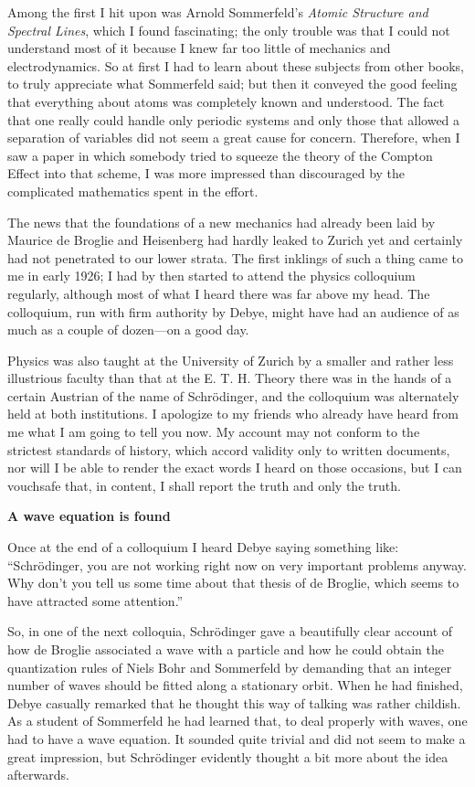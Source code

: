 \documentclass[12pt]{article}
\begin{document}
Among the first I hit upon was Arnold Sommerfeld's {\it Atomic Structure and Spectral Lines}, which I found fascinating; the only trouble was that I could not understand most of it because I knew far too little of mechanics and electrodynamics. So at first I had to learn about these subjects from other books, to truly appreciate what Sommerfeld said; but then it conveyed the good feeling that everything about atoms was completely known and understood. The fact that one really could handle only periodic systems and only those that allowed a separation of variables did not seem a great cause for concern. Therefore, when I saw a paper in which somebody tried to squeeze the theory of the Compton Effect into that scheme, I was more impressed than discouraged by the complicated mathematics spent in the effort.

The news that the foundations of a new mechanics had already been laid by Maurice de Broglie and Heisenberg had hardly leaked to Zurich yet and certainly had not penetrated to our lower strata. The first inklings of such a thing came to me in early 1926; I had by then started to attend the physics colloquium regularly, although most of what I heard there was far above my head. The colloquium, run
with firm authority by Debye, might have had an audience of as much as a couple of dozen---on a good day.

Physics was also taught at the University of Zurich by a smaller and rather less illustrious faculty than that at the E. T. H. Theory there was in the hands of a certain Austrian of the name of Schr\"odinger, and the colloquium was alternately held at both institutions. I apologize to my friends who already have heard from me what I am going to tell you now. My account may not conform to the strictest standards of history, which accord validity only to written documents, nor will I be able to render the exact words I heard on those occasions, but I can vouchsafe that, in content, I shall report the truth and only the truth.

\bigskip
\noindent
{\bf A wave equation is found}

\smallskip
Once at the end of a colloquium I heard Debye saying something like: ``Schr\"odinger, you are not working right now on very important problems anyway. Why don't you tell us some time about that thesis of de Broglie, which seems to have attracted some attention.''

So, in one of the next colloquia, Schr\"odinger gave a beautifully clear account of how de Broglie associated a wave with a particle and how he could obtain the quantization rules of Niels Bohr and Sommerfeld by demanding that an integer number of waves should be fitted along a stationary orbit. When he had finished, Debye casually remarked that he thought this way of talking was rather childish. As a student of Sommerfeld he had learned that, to deal properly with waves, one had to have a wave equation. It sounded quite trivial and did not seem to make a great impression, but Schr\"odinger evidently thought a bit more about the idea afterwards.
\end{document}
